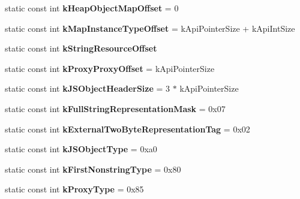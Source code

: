 \begin{DoxyCompactItemize}
\item 
\hypertarget{classv8_1_1internal_1_1_internals_a0902a596b5656b4592157eaacc020512}{}static const int {\bfseries k\+Heap\+Object\+Map\+Offset} = 0\label{classv8_1_1internal_1_1_internals_a0902a596b5656b4592157eaacc020512}

\item 
\hypertarget{classv8_1_1internal_1_1_internals_a39ea290dfaa9de300bd79aa73a874a88}{}static const int {\bfseries k\+Map\+Instance\+Type\+Offset} = k\+Api\+Pointer\+Size + k\+Api\+Int\+Size\label{classv8_1_1internal_1_1_internals_a39ea290dfaa9de300bd79aa73a874a88}

\item 
static const int {\bfseries k\+String\+Resource\+Offset}
\item 
\hypertarget{classv8_1_1internal_1_1_internals_a2f7609ff68b17c9fc15d58bd2dee47aa}{}static const int {\bfseries k\+Proxy\+Proxy\+Offset} = k\+Api\+Pointer\+Size\label{classv8_1_1internal_1_1_internals_a2f7609ff68b17c9fc15d58bd2dee47aa}

\item 
\hypertarget{classv8_1_1internal_1_1_internals_af8faf3ff3271d26bafa6ca0ea87e2a57}{}static const int {\bfseries k\+J\+S\+Object\+Header\+Size} = 3 $\ast$ k\+Api\+Pointer\+Size\label{classv8_1_1internal_1_1_internals_af8faf3ff3271d26bafa6ca0ea87e2a57}

\item 
\hypertarget{classv8_1_1internal_1_1_internals_a5c39a86b30463928ea719def66916507}{}static const int {\bfseries k\+Full\+String\+Representation\+Mask} = 0x07\label{classv8_1_1internal_1_1_internals_a5c39a86b30463928ea719def66916507}

\item 
\hypertarget{classv8_1_1internal_1_1_internals_a73faf917416d2519b65c7255e77a74ce}{}static const int {\bfseries k\+External\+Two\+Byte\+Representation\+Tag} = 0x02\label{classv8_1_1internal_1_1_internals_a73faf917416d2519b65c7255e77a74ce}

\item 
\hypertarget{classv8_1_1internal_1_1_internals_a56b7062df5d9a7df491137d4c3341bcc}{}static const int {\bfseries k\+J\+S\+Object\+Type} = 0xa0\label{classv8_1_1internal_1_1_internals_a56b7062df5d9a7df491137d4c3341bcc}

\item 
\hypertarget{classv8_1_1internal_1_1_internals_a6f4a54927b01a11f444fb2f00b47ca1d}{}static const int {\bfseries k\+First\+Nonstring\+Type} = 0x80\label{classv8_1_1internal_1_1_internals_a6f4a54927b01a11f444fb2f00b47ca1d}

\item 
\hypertarget{classv8_1_1internal_1_1_internals_a6d6dcaebff54df16184fe40e63c0917c}{}static const int {\bfseries k\+Proxy\+Type} = 0x85\label{classv8_1_1internal_1_1_internals_a6d6dcaebff54df16184fe40e63c0917c}

\end{DoxyCompactItemize}


